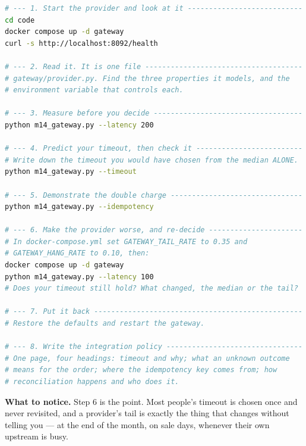 \begin{lab}
\begin{lstlisting}[language=bash]
# --- 1. Start the provider and look at it ---------------------------
cd code
docker compose up -d gateway
curl -s http://localhost:8092/health

# --- 2. Read it. It is one file -------------------------------------
# gateway/provider.py. Find the three properties it models, and the
# environment variable that controls each.

# --- 3. Measure before you decide -----------------------------------
python m14_gateway.py --latency 200

# --- 4. Predict your timeout, then check it -------------------------
# Write down the timeout you would have chosen from the median ALONE.
python m14_gateway.py --timeout

# --- 5. Demonstrate the double charge -------------------------------
python m14_gateway.py --idempotency

# --- 6. Make the provider worse, and re-decide ----------------------
# In docker-compose.yml set GATEWAY_TAIL_RATE to 0.35 and
# GATEWAY_HANG_RATE to 0.10, then:
docker compose up -d gateway
python m14_gateway.py --latency 100
# Does your timeout still hold? What changed, the median or the tail?

# --- 7. Put it back -------------------------------------------------
# Restore the defaults and restart the gateway.

# --- 8. Write the integration policy --------------------------------
# One page, four headings: timeout and why; what an unknown outcome
# means for the order; where the idempotency key comes from; how
# reconciliation happens and who does it.
\end{lstlisting}

\smallskip
\textbf{What to notice.} Step 6 is the point. Most people's timeout is chosen
once and never revisited, and a provider's tail is exactly the thing that
changes without telling you --- at the end of the month, on sale days, whenever
their own upstream is busy.
\end{lab}

